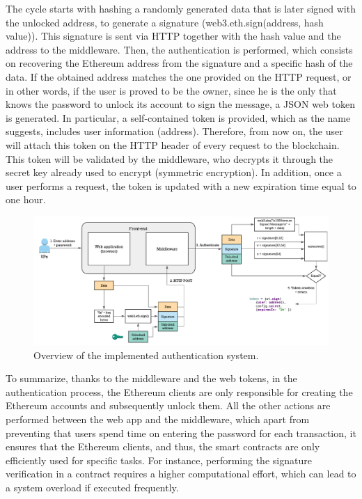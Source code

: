 The cycle starts with hashing a randomly generated data that is later signed with the unlocked address, to generate a signature (web3.eth.sign(address, hash value)). This signature is sent via HTTP together with the hash value and the address to the middleware. Then, the authentication is performed, which consists on recovering the  Ethereum address from the signature and a specific hash of the data. If the obtained address matches the one provided on the HTTP request, or in other words, if the user is proved to be the owner, since he is the only that knows the password to unlock its account to sign the message, a JSON web token is generated. In particular, a self-contained token is provided, which as the name suggests, includes user information (address). Therefore, from now on, the user will attach this token on the HTTP header of every request to the blockchain. This token will be validated by the middleware, who decrypts it through the secret key already used to encrypt (symmetric encryption). In addition, once a user performs a request, the token is updated with a new expiration time equal to one hour.

\begin{figure}[bth]
	\centering
	\includegraphics[width=1\linewidth]{gfx/Authentication_implementation}    
  	\caption{Overview of the implemented authentication system.}
  	\label{fig:authImplem}
\end{figure}

To summarize, thanks to the middleware and the web tokens, in the authentication process, the Ethereum clients are only responsible for creating the Ethereum accounts and subsequently unlock them. All the other actions are performed between the web app and the middleware, which apart from preventing that users spend time on entering the password for each transaction, it ensures that the Ethereum clients, and thus, the smart contracts are only efficiently used for specific tasks. For instance, performing the signature verification in a contract requires a higher computational effort, which can lead to a system overload if executed frequently.


